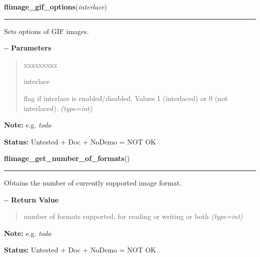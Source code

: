 \hspace{.8\funcindent}\begin{boxedminipage}{\funcwidth}

    \raggedright \textbf{flimage\_gif\_options}(\textit{interlace})

    \vspace{-1.5ex}

    \rule{\textwidth}{0.5\fboxrule}
\setlength{\parskip}{2ex}

Sets options of GIF images.

-{}-
\setlength{\parskip}{1ex}
      \textbf{Parameters}
      \vspace{-1ex}

      \begin{quote}
        \begin{Ventry}{xxxxxxxxx}

          \item[interlace]


flag if interlace is enabled/disabled. Values 1 (interlaced) or 0
(not interlaced).
            {\it (type=int)}

        \end{Ventry}

      \end{quote}

\textbf{Note:} 
e.g. \emph{todo}


\textbf{Status:} 
Untested + Doc + NoDemo = NOT OK


    \end{boxedminipage}

    \label{xformslib:flflimage:flimage_get_number_of_formats}

    \vspace{0.5ex}

\hspace{.8\funcindent}\begin{boxedminipage}{\funcwidth}

    \raggedright \textbf{flimage\_get\_number\_of\_formats}()

    \vspace{-1.5ex}

    \rule{\textwidth}{0.5\fboxrule}
\setlength{\parskip}{2ex}

Obtains the number of currently supported image format.

-{}-
\setlength{\parskip}{1ex}
      \textbf{Return Value}
    \vspace{-1ex}

      \begin{quote}

number of formats supported, for reading or writing or both
      {\it (type=int)}

      \end{quote}

\textbf{Note:} 
e.g. \emph{todo}


\textbf{Status:} 
Untested + Doc + NoDemo = NOT OK


    \end{boxedminipage}

